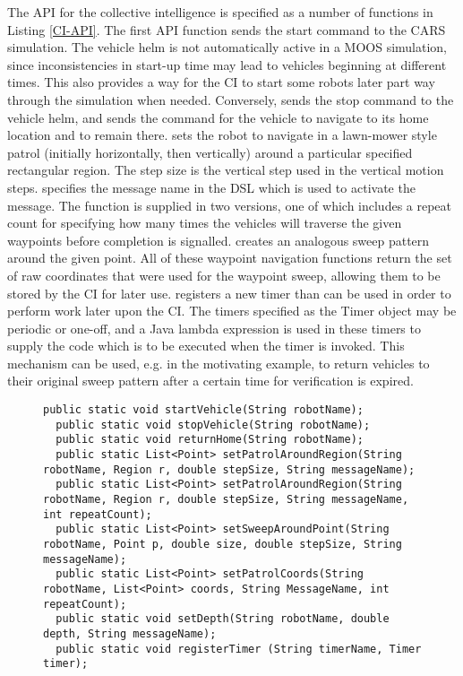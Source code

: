 The API for the collective intelligence is specified as a number of functions in
Listing \ref{CI-API}. The first API function  sends the start
command to the CARS simulation. The vehicle helm is not automatically active in
a MOOS simulation, since inconsistencies in start-up time may lead to vehicles
beginning at different times. This also provides a way for the CI to start some
robots later part way through the simulation when needed. Conversely,
 sends the stop command to the vehicle helm, and
 sends the command for the vehicle to navigate to its home
location and to remain there.  sets the robot to
navigate in a lawn-mower style patrol (initially horizontally, then vertically)
around a particular specified rectangular region. The step size is the vertical
step used in the vertical motion steps.  specifies the message
name in the DSL which is used to activate the message. The function is supplied
in two versions, one of which includes a repeat count for specifying how many
times the vehicles will traverse the given waypoints before completion is
signalled.  creates an analogous sweep pattern
around the given point. All of these waypoint navigation functions return the
set of raw coordinates that were used for the waypoint sweep, allowing them to
be stored by the CI for later use.  registers a new
timer than can be used in order to perform work later upon the CI. The timers
specified as the Timer object may be periodic or one-off, and a Java lambda
expression is used in these timers to supply the code which is to be executed
when the timer is invoked. This mechanism can be used, e.g. in the motivating
example, to return vehicles to their original sweep pattern after a certain time
for verification is expired.



\begin{figure}[t]
\begin{lstlisting}[basicstyle=\scriptsize, caption=CI API function interface, label={CI-API}]
  public static void startVehicle(String robotName);
  public static void stopVehicle(String robotName);
  public static void returnHome(String robotName);
  public static List<Point> setPatrolAroundRegion(String robotName, Region r, double stepSize, String messageName);
  public static List<Point> setPatrolAroundRegion(String robotName, Region r, double stepSize, String messageName, int repeatCount);
  public static List<Point> setSweepAroundPoint(String robotName, Point p, double size, double stepSize, String messageName);
  public static List<Point> setPatrolCoords(String robotName, List<Point> coords, String MessageName, int repeatCount);
  public static void setDepth(String robotName, double depth, String messageName);
  public static void registerTimer (String timerName, Timer timer);
\end{lstlisting}
\end{figure}



